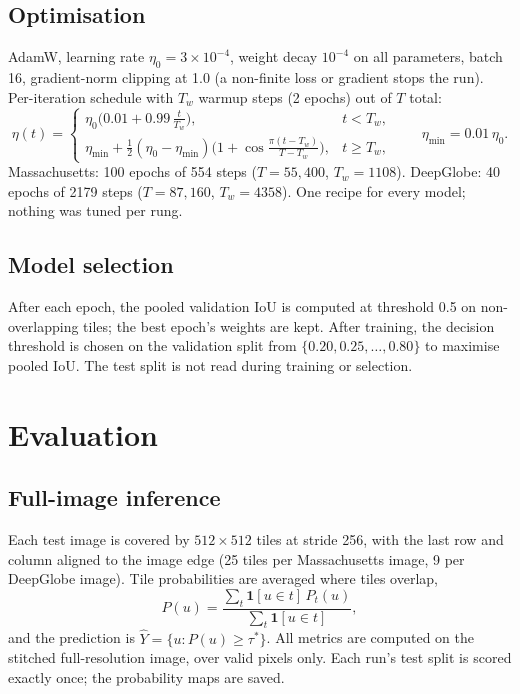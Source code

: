 \documentclass[11pt]{article}
\begin{document}
\subsection{Optimisation}

AdamW, learning rate $\eta_0 = 3\times10^{-4}$, weight decay $10^{-4}$ on all parameters, batch 16,
gradient-norm clipping at 1.0 (a non-finite loss or gradient stops the run). Per-iteration schedule
with $T_w$ warmup steps (2 epochs) out of $T$ total:
\begin{equation}
  \eta(t) =
  \begin{cases}
    \eta_0\big(0.01 + 0.99\,\tfrac{t}{T_w}\big), & t < T_w,\\[4pt]
    \eta_{\min} + \tfrac12(\eta_0-\eta_{\min})\Big(1+\cos\tfrac{\pi(t-T_w)}{T-T_w}\Big), & t \ge T_w,
  \end{cases}
  \qquad \eta_{\min} = 0.01\,\eta_0.
\end{equation}
Massachusetts: 100 epochs of 554 steps ($T = 55{,}400$, $T_w = 1108$). DeepGlobe: 40 epochs of
2179 steps ($T = 87{,}160$, $T_w = 4358$). One recipe for every model; nothing was tuned per rung.

\subsection{Model selection}

After each epoch, the pooled validation IoU is computed at threshold 0.5 on non-overlapping tiles;
the best epoch's weights are kept. After training, the decision threshold is chosen on the
validation split from $\{0.20, 0.25, \dots, 0.80\}$ to maximise pooled IoU. The test split is not
read during training or selection.

\section{Evaluation}
\label{sec:eval}

\subsection{Full-image inference}

Each test image is covered by $512\times512$ tiles at stride 256, with the last row and column
aligned to the image edge (25 tiles per Massachusetts image, 9 per DeepGlobe image). Tile
probabilities are averaged where tiles overlap,
\begin{equation}
  P(u) = \frac{\sum_t \mathbf{1}[u\in t]\,P_t(u)}{\sum_t \mathbf{1}[u\in t]},
\end{equation}
and the prediction is $\hat Y = \{u : P(u) \ge \tau^\ast\}$. All metrics are computed on the
stitched full-resolution image, over valid pixels only. Each run's test split is scored exactly
once; the probability maps are saved.
\end{document}
